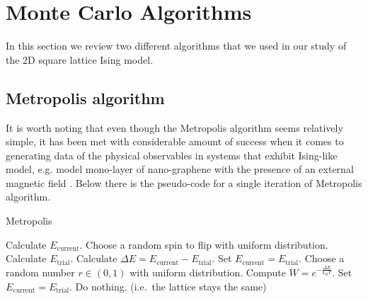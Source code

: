 \documentclass[pra,aps,superscriptaddress,amssymb,amsmath,reprint,noeprint,floatfix]{revtex4-2}
\begin{document}
\section{\label{sec:algorithms}Monte Carlo Algorithms}
In this section we review two different algorithms that we used in our study of the 2D square lattice Ising model.
\subsection{\label{subsec:metropolis}Metropolis algorithm}
It is worth noting that even though the Metropolis algorithm seems relatively simple, it has been met with considerable amount of success when it comes to generating data of the physical observables in systems that exhibit Ising-like model, e.g. model mono-layer of nano-graphene with the presence of an external magnetic field \cite{IVASHKO2019165617}. Below there is the pseudo-code for a single iteration of Metropolis algorithm.
\begin{algorithm}[H]
    \caption{Metropolis}
    \begin{algorithmic}[1]
        \State Calculate $E_\mathrm{current}$.
        \State Choose a random spin to flip with uniform distribution.
        \State Calculate $E_\mathrm{trial}$.
        \State Calculate $\Delta E=E_\mathrm{current}-E_\mathrm{trial}$.
            \State Set $E_\mathrm{current}=E_\mathrm{trial}$.
        \Else 
            \State Choose a random number $r\in(0,1)$ with uniform distribution.
            \State Compute $W=e^{-\frac{\Delta E}{k_BT}}$.
                \State Set $E_\mathrm{current}=E_\mathrm{trial}$.
            \Else
                \State Do nothing. (i.e.\ the lattice stays the same)
            \EndIf
        \EndIf
    \end{algorithmic}
    \label{alg:metropolis}
\end{algorithm}
\end{document}
